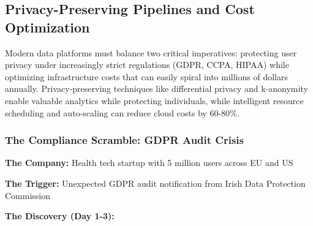 \subsection{Privacy-Preserving Pipelines and Cost Optimization}

Modern data platforms must balance two critical imperatives: protecting user privacy under increasingly strict regulations (GDPR, CCPA, HIPAA) while optimizing infrastructure costs that can easily spiral into millions of dollars annually. Privacy-preserving techniques like differential privacy and k-anonymity enable valuable analytics while protecting individuals, while intelligent resource scheduling and auto-scaling can reduce cloud costs by 60-80\%.

\subsubsection{The Compliance Scramble: GDPR Audit Crisis}

\textbf{The Company:} Health tech startup with 5 million users across EU and US

\textbf{The Trigger:} Unexpected GDPR audit notification from Irish Data Protection Commission

\textbf{The Discovery (Day 1-3):}

